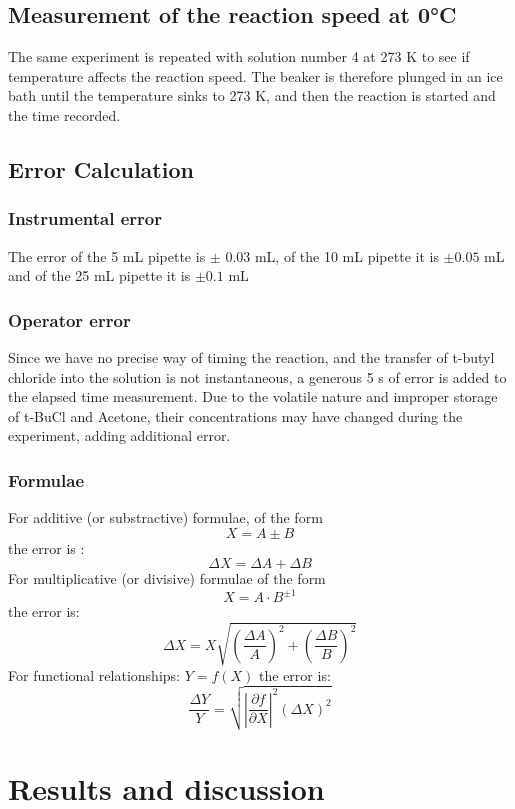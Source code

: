 \documentclass[12pt]{article}
\begin{document}
\subsection{Measurement of the reaction speed at 0°C}
The same experiment is repeated with solution number 4 at 273 K to see if temperature affects the reaction speed. The beaker is therefore plunged in an ice bath until the temperature sinks to 273 K, and then the reaction is started and the time recorded. 

\subsection{Error Calculation}

\subsubsection{Instrumental error}

The error of the 5 mL pipette is $\pm$ 0.03 mL, of the 10 mL pipette it is $\pm 0.05$ mL and of the 25 mL pipette it is $\pm 0.1$ mL

\subsubsection{Operator error}

Since we have no precise way of timing the reaction, and the transfer of t-butyl chloride into the solution is not instantaneous, a generous 5 s of error is added to the elapsed time measurement. Due to the volatile nature and improper storage of t-BuCl and Acetone, their concentrations may have changed during the experiment, adding additional error.   

\subsubsection{Formulae}

For additive (or substractive) formulae, of the form \[ X = A \pm B\] the error is : \[\Delta X = \Delta A + \Delta B\]
For multiplicative (or divisive) formulae of the form \[X = A \cdot  B^{\pm 1}\] the error is: \[  \Delta X = X\sqrt{\left(\frac{\Delta A}{A}\right)^2+\left(\frac{\Delta B}{B}\right)^2} \]
For functional relationships: $Y=f(X)$ the error is: \[ \frac{\Delta Y}{Y} = \sqrt{\left|\frac{\partial f}{\partial X}\right|^2(\Delta X)^2} \]

\section{Results and discussion}
\end{document}
